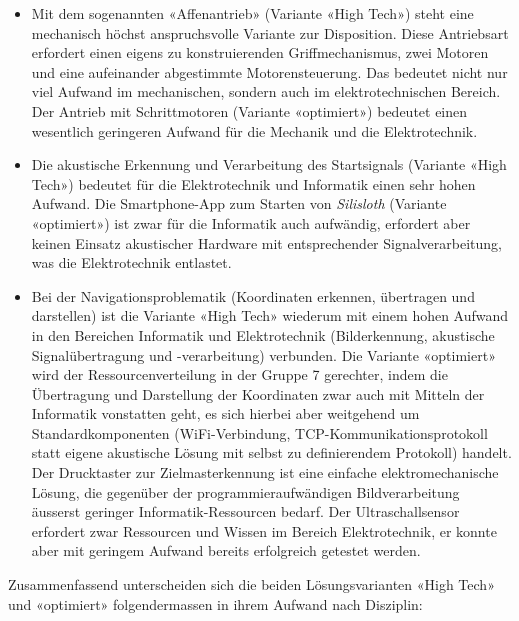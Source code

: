 \documentclass[a4paper,11pt]{scrartcl}
\begin{document}
\begin{itemize}
   \item Mit dem sogenannten «Affenantrieb» (Variante «High Tech») steht eine mechanisch höchst anspruchsvolle Variante zur Disposition. Diese Antriebsart erfordert einen eigens zu konstruierenden Griffmechanismus, zwei Motoren und eine aufeinander abgestimmte Motorensteuerung. Das bedeutet nicht nur viel Aufwand im mechanischen, sondern auch im elektrotechnischen Bereich. Der Antrieb mit Schrittmotoren (Variante «optimiert») bedeutet einen wesentlich geringeren Aufwand für die Mechanik und die Elektrotechnik.
   \item Die akustische Erkennung und Verarbeitung des Startsignals (Variante «High Tech») bedeutet für die Elektrotechnik und Informatik einen sehr hohen Aufwand. Die Smartphone-App zum Starten von \textit{Silisloth} (Variante «optimiert») ist zwar für die Informatik auch aufwändig, erfordert aber keinen Einsatz akustischer Hardware mit entsprechender Signalverarbeitung, was die Elektrotechnik entlastet.
   \item Bei der Navigationsproblematik (Koordinaten erkennen, übertragen und darstellen) ist die Variante «High Tech» wiederum mit einem hohen Aufwand in den Bereichen Informatik und Elektrotechnik (Bilderkennung, akustische Signalübertragung und -verarbeitung) verbunden. Die Variante «optimiert» wird der Ressourcenverteilung in der Gruppe 7 gerechter, indem die Übertragung und Darstellung der Koordinaten zwar auch mit Mitteln der Informatik vonstatten geht, es sich hierbei aber weitgehend um Standardkomponenten (WiFi-Verbindung, TCP-Kommunikationsprotokoll statt eigene akustische Lösung mit selbst zu definierendem Protokoll) handelt. Der Drucktaster zur Zielmasterkennung ist eine einfache elektromechanische Lösung, die gegenüber der programmieraufwändigen Bildverarbeitung äusserst geringer Informatik-Ressourcen bedarf. Der Ultraschallsensor erfordert zwar Ressourcen und Wissen im Bereich Elektrotechnik, er konnte aber mit geringem Aufwand bereits erfolgreich getestet werden.
\end{itemize}

Zusammenfassend unterscheiden sich die beiden Lösungsvarianten «High Tech» und «optimiert» folgendermassen in ihrem Aufwand nach Disziplin:
\end{document}
